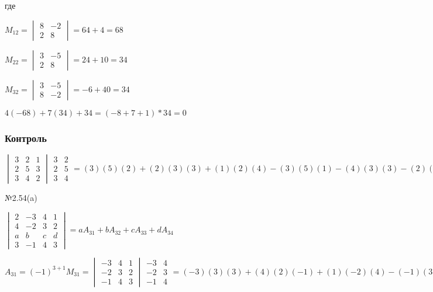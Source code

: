 \documentclass{article}
\begin{document}
где

$
M_{12} =
\begin{vmatrix}
	8 & -2 \\
	2 & 8
\end{vmatrix}
= 64 + 4 = 68
$

$
M_{22} =
\begin{vmatrix}
	3 & -5 \\
	2 & 8
\end{vmatrix}
= 24 + 10 = 34
$

$
M_{32} =
\begin{vmatrix}
	3 & -5 \\
	8 & -2
\end{vmatrix}
= -6 + 40 = 34
$

$
4(-68) + 7(34) + 34 = (-8 + 7 + 1) * 34 = 0
$

\subsubsection{Контроль}

$
\begin{vmatrix}
	3 & 2 & 1 \\
	2 & 5 & 3 \\
	3 & 4 & 2
\end{vmatrix}
\begin{matrix}
	3 & 2 \\
	2 & 5 \\
	3 & 4
\end{matrix}
= (3)(5)(2) + (2)(3)(3) + (1)(2)(4)
- (3)(5)(1) - (4)(3)(3) - (2)(2)(2) =
30 + 18 + 8 - 15 - 36 - 8 = -3
$

№2.54(a)

$
\begin{vmatrix}
	2 & -3 & 4 & 1 \\
	4 & -2 & 3 & 2 \\
	a & b & c & d \\
	3 & -1 & 4 & 3
\end{vmatrix}
= a A_{31} + b A_{32} + c A_{33} + d A_{34}
$

$
A_{31} = (-1)^{3+1} M_{31} =
\begin{vmatrix}
	-3 & 4 & 1 \\
	-2 & 3 & 2 \\
	-1 & 4 & 3
\end{vmatrix}
\begin{matrix}
	-3 & 4 \\
	-2 & 3 \\
	-1 & 4
\end{matrix}
= (-3)(3)(3) + (4)(2)(-1) + (1)(-2)(4)
- (-1)(3)(1) - (4)(2)(-3) - (3)(-2)(4) =
-27 - 8 - 8 + 3 + 24 + 24 = 8
$
\end{document}
